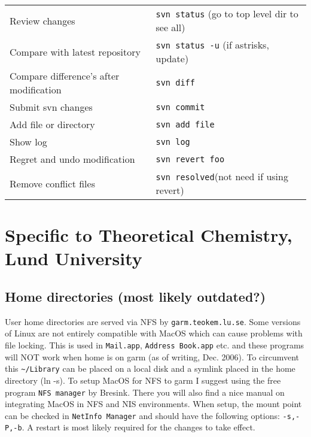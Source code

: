 \documentclass[a4paper,10pt]{article}
\begin{document}
\begin{table}[h]
\begin{small}
\begin{tabular}{ll}
Review changes       & \verb"svn status" (go to top level dir to see all)\\
Compare with latest repository & \verb"svn status -u" (if astrisks, update)\\
Compare difference's after modification& \verb"svn diff"\\
Submit svn changes   & \verb"svn commit"\\
Add file or directory& \verb"svn add file"\\
Show log             & \verb"svn log"\\
Regret and undo modification & \verb"svn revert foo"\\
Remove conflict files        & \verb"svn resolved"(not need if using revert)\\
\hline
\end{tabular}
\end{small}
\end{table}


\section{Specific to Theoretical Chemistry, Lund University}
\subsection{Home directories (most likely outdated?)}
User home directories are served via NFS by \verb'garm.teokem.lu.se'. Some
versions of Linux are not entirely compatible with MacOS which can cause
problems with file locking. This is used in \verb+Mail.app+, \verb+Address Book.app+
etc. and these programs will NOT work when home is on garm (as of
writing, Dec. 2006). To circumvent this \verb+~/Library+ can be placed on a
local disk and a symlink placed in the home directory (ln -s).
To setup MacOS for NFS to garm I suggest using the free program
\verb+NFS manager+ by Bresink.
There you will also find a nice manual on integrating MacOS in NFS
and NIS environments. When setup, the mount point can be checked in
\verb+NetInfo Manager+ and should have the following options: \verb+-s,-P,-b+.
A restart is most likely required for the changes to take effect.
\end{document}
